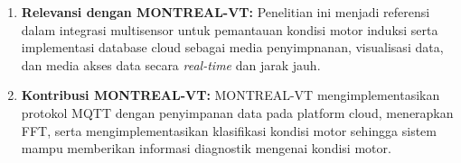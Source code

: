 \documentclass{elsinta}
\begin{document}
\begin{enumerate}
\begin{enumerate}
        \item \textbf{Relevansi dengan MONTREAL-VT:} Penelitian ini menjadi referensi dalam integrasi multisensor untuk pemantauan kondisi motor induksi serta implementasi database cloud sebagai media penyimpnanan, visualisasi data, dan media akses data secara \textit{real-time} dan jarak jauh.
        \item \textbf{Kontribusi MONTREAL-VT:} MONTREAL-VT mengimplementasikan protokol MQTT dengan penyimpanan data pada platform cloud, menerapkan FFT, serta mengimplementasikan klasifikasi kondisi motor sehingga sistem mampu memberikan informasi diagnostik mengenai kondisi motor.
    \end{enumerate}
\end{enumerate}

\section{\GapAnalysisTitle}
\end{document}
